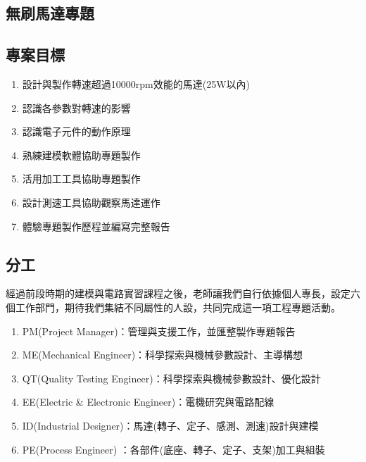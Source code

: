 \documentclass[12pt,a4paper]{article}
\begin{document}
\begin{CJK*}{UTF8}{bkai}
    \section{無刷馬達專題}

    \subsection{專案目標}
    \label{sec:goal}
    \begin{enumerate}
        \item 設計與製作轉速超過10000rpm效能的馬達(25W以內)
        \item 認識各參數對轉速的影響
        \item 認識電子元件的動作原理
        \item 熟練建模軟體協助專題製作
        \item 活用加工工具協助專題製作
        \item 設計測速工具協助觀察馬達運作
        \item 體驗專題製作歷程並編寫完整報告
    \end{enumerate}

    \subsection{分工}
    經過前段時期的建模與電路實習課程之後，老師讓我們自行依據個人專長，設定六個工作部門，期待我們集結不同屬性的人設，共同完成這一項工程專題活動。
    \begin{enumerate}
        \item PM(Project Manager)：管理與支援工作，並匯整製作專題報告
        \item ME(Mechanical Engineer)：科學探索與機械參數設計、主導構想
        \item QT(Quality Testing Engineer)：科學探索與機械參數設計、優化設計
        \item EE(Electric \& Electronic Engineer)：電機研究與電路配線
        \item ID(Industrial Designer)：馬達(轉子、定子、感測、測速)設計與建模
        \item PE(Process Engineer) ：各部件(底座、轉子、定子、支架)加工與組裝
    \end{enumerate}


\end{CJK*}
\end{document}
